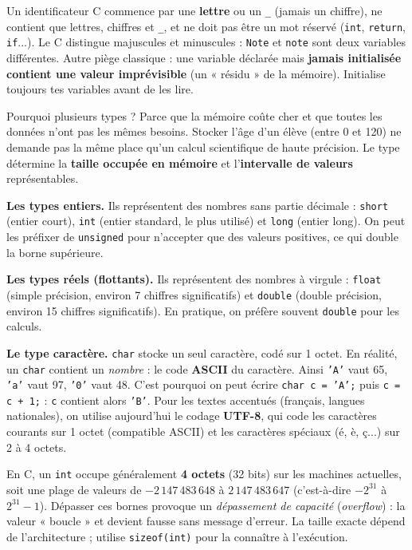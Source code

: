 \documentclass[11pt]{article}
\newcounter{popsec}
\newcounter{popsub}
\newcommand{\courssub}[1]{%
  \stepcounter{popsub}%
  \par\vspace{9pt}\noindent{\popxbold\fontsize{11.5}{13}\selectfont\color{popink}{\color{poporange}\thepopsec.\thepopsub}\hspace{6pt}#1}\par\nopagebreak\vspace{4pt}
}
\begin{document}
\begin{attention}
Un identificateur C commence par une \textbf{lettre} ou un \texttt{\_} (jamais un chiffre), ne contient que lettres, chiffres et \texttt{\_}, et ne doit pas être un mot réservé (\texttt{int}, \texttt{return}, \texttt{if}...). Le C distingue majuscules et minuscules : \texttt{Note} et \texttt{note} sont deux variables différentes. Autre piège classique : une variable déclarée mais \textbf{jamais initialisée contient une valeur imprévisible} (un « résidu » de la mémoire). Initialise toujours tes variables avant de les lire.
\end{attention}

\courssub{Les types de base du langage C}

Pourquoi plusieurs types ? Parce que la mémoire coûte cher et que toutes les données n'ont pas les mêmes besoins. Stocker l'âge d'un élève (entre 0 et 120) ne demande pas la même place qu'un calcul scientifique de haute précision. Le type détermine la \textbf{taille occupée en mémoire} et l'\textbf{intervalle de valeurs} représentables.

\textbf{Les types entiers.} Ils représentent des nombres sans partie décimale : \texttt{short} (entier court), \texttt{int} (entier standard, le plus utilisé) et \texttt{long} (entier long). On peut les préfixer de \texttt{unsigned} pour n'accepter que des valeurs positives, ce qui double la borne supérieure.

\textbf{Les types réels (flottants).} Ils représentent des nombres à virgule : \texttt{float} (simple précision, environ 7 chiffres significatifs) et \texttt{double} (double précision, environ 15 chiffres significatifs). En pratique, on préfère souvent \texttt{double} pour les calculs.

\textbf{Le type caractère.} \texttt{char} stocke un seul caractère, codé sur 1 octet. En réalité, un \texttt{char} contient un \emph{nombre} : le code \textbf{ASCII} du caractère. Ainsi \texttt{'A'} vaut 65, \texttt{'a'} vaut 97, \texttt{'0'} vaut 48. C'est pourquoi on peut écrire \texttt{char c = 'A';} puis \texttt{c = c + 1;} : \texttt{c} contient alors \texttt{'B'}. Pour les textes accentués (français, langues nationales), on utilise aujourd'hui le codage \textbf{UTF-8}, qui code les caractères courants sur 1 octet (compatible ASCII) et les caractères spéciaux (é, è, ç...) sur 2 à 4 octets.

\begin{propriete}
En C, un \texttt{int} occupe généralement \textbf{4 octets} (32 bits) sur les machines actuelles, soit une plage de valeurs de $-2\,147\,483\,648$ à $2\,147\,483\,647$ (c'est-à-dire $-2^{31}$ à $2^{31}-1$). Dépasser ces bornes provoque un \emph{dépassement de capacité} (\emph{overflow}) : la valeur « boucle » et devient fausse sans message d'erreur. La taille exacte dépend de l'architecture ; utilise \texttt{sizeof(int)} pour la connaître à l'exécution.
\end{propriete}
\end{document}
